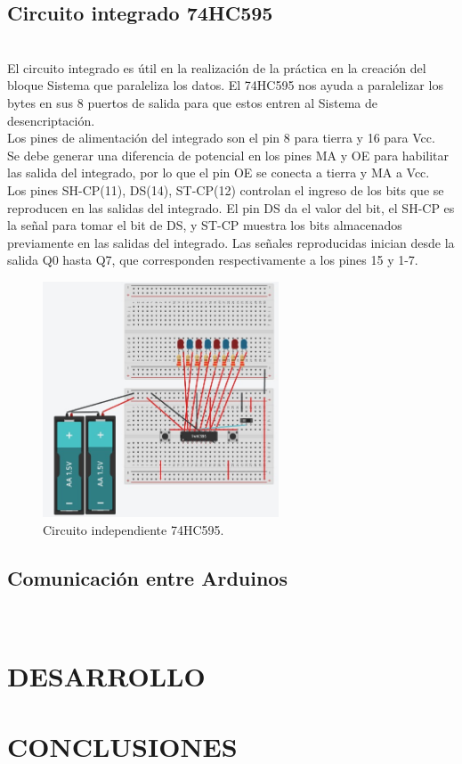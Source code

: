 \documentclass{article}
\begin{document}
\subsection{Circuito integrado 74HC595}\\
El circuito integrado es útil en la realización de la práctica en la creación del bloque Sistema que paraleliza los datos. El 74HC595 nos ayuda a paralelizar los bytes en sus 8 puertos de salida para que estos entren al Sistema de desencriptación.\\

Los pines de alimentación del integrado son el pin 8 para tierra y 16 para Vcc.\\

Se debe generar una diferencia de potencial en los pines MA y OE para habilitar las salida del integrado, por lo que el pin OE se conecta a tierra y MA a Vcc.\\

Los pines SH-CP(11), DS(14), ST-CP(12) controlan el ingreso de los bits que se reproducen en las salidas del integrado. El pin DS da el valor del bit, el SH-CP es la señal para tomar el bit de DS, y ST-CP muestra los bits almacenados previamente en las salidas del integrado. Las señales reproducidas inician desde la salida Q0 hasta Q7, que corresponden respectivamente a los pines 15 y 1-7.\\


\begin{figure}[h]
\includegraphics[width=7cm]{74HC595.jpg}
\centering
\caption{Circuito independiente 74HC595.}
\label{fig:74HC595.jpg}
\end{figure}




\subsection{Comunicación entre Arduinos}\\




\section{DESARROLLO}



\section{CONCLUSIONES} \label{conclulsion}

    


%

\end{document}
